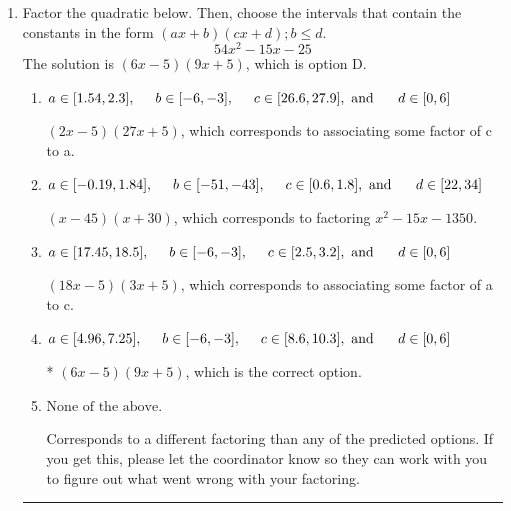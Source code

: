 \documentclass{extbook}[14pt]
\newcommand{\litem}[1]{\item #1

\rule{\textwidth}{0.4pt}}
\begin{document}
\begin{enumerate}\litem{
Factor the quadratic below. Then, choose the intervals that contain the constants in the form $(ax+b)(cx+d); b \leq d.$
\[ 54x^{2} -15 x -25 \]
The solution is \( (6x -5)(9x + 5) \), which is option D.\begin{enumerate}[label=\Alph*.]
\item \( a \in [1.54, 2.3], \hspace*{5mm} b \in [-6, -3], \hspace*{5mm} c \in [26.6, 27.9], \text{ and } \hspace*{5mm} d \in [0, 6] \)

 $(2x -5)(27x + 5)$, which corresponds to associating some factor of c to a.
\item \( a \in [-0.19, 1.84], \hspace*{5mm} b \in [-51, -43], \hspace*{5mm} c \in [0.6, 1.8], \text{ and } \hspace*{5mm} d \in [22, 34] \)

 $(x -45)(x + 30)$, which corresponds to factoring $x^{2} -15 x -1350$.
\item \( a \in [17.45, 18.5], \hspace*{5mm} b \in [-6, -3], \hspace*{5mm} c \in [2.5, 3.2], \text{ and } \hspace*{5mm} d \in [0, 6] \)

 $(18x -5)(3x + 5)$, which corresponds to associating some factor of a to c.
\item \( a \in [4.96, 7.25], \hspace*{5mm} b \in [-6, -3], \hspace*{5mm} c \in [8.6, 10.3], \text{ and } \hspace*{5mm} d \in [0, 6] \)

* $(6x -5)(9x + 5)$, which is the correct option.
\item \( \text{None of the above.} \)

 Corresponds to a different factoring than any of the predicted options. If you get this, please let the coordinator know so they can work with you to figure out what went wrong with your factoring.
\end{enumerate}

}
\end{enumerate}
\end{document}
